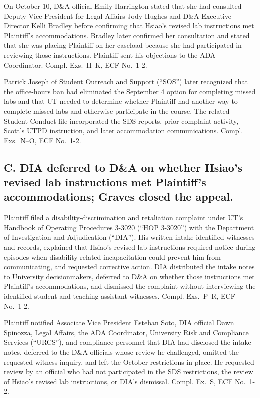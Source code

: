 \documentclass[12pt]{article}
\newcommand{\ComplEx}[1]{Compl. Ex.~#1, ECF No.~1-2}
\newcommand{\ComplExs}[1]{Compl. Exs.~#1, ECF No.~1-2}
\begin{document}
On October 10, D\&A official Emily Harrington stated that she had consulted Deputy Vice President for Legal Affairs Jody Hughes and D\&A Executive Director Kelli Bradley before confirming that Hsiao's revised lab instructions met Plaintiff's accommodations. Bradley later confirmed her consultation and stated that she was placing Plaintiff on her caseload because she had participated in reviewing those instructions. Plaintiff sent his objections to the ADA Coordinator. \ComplExs{H--K}.
 
Patrick Joseph of Student Outreach and Support (``SOS'') later recognized that the office-hours ban had eliminated the September 4 option for completing missed labs and that UT needed to determine whether Plaintiff had another way to complete missed labs and otherwise participate in the course. The related Student Conduct file incorporated the SDS reports, prior complaint activity, Scott's UTPD instruction, and later accommodation communications. \ComplExs{N--O}.
 
\subsection*{C. DIA deferred to D\&A on whether Hsiao's revised lab instructions met Plaintiff's accommodations; Graves closed the appeal.}
 
Plaintiff filed a disability-discrimination and retaliation complaint under UT's Handbook of Operating Procedures 3-3020 (``HOP 3-3020'') with the Department of Investigation and Adjudication (``DIA''). His written intake identified witnesses and records, explained that Hsiao's revised lab instructions required notice during episodes when disability-related incapacitation could prevent him from communicating, and requested corrective action. DIA distributed the intake notes to University decisionmakers, deferred to D\&A on whether those instructions met Plaintiff's accommodations, and dismissed the complaint without interviewing the identified student and teaching-assistant witnesses. \ComplExs{P--R}.
 
Plaintiff notified Associate Vice President Esteban Soto, DIA official Dawn Spinozza, Legal Affairs, the ADA Coordinator, University Risk and Compliance Services (``URCS''), and compliance personnel that DIA had disclosed the intake notes, deferred to the D\&A officials whose review he challenged, omitted the requested witness inquiry, and left the October restrictions in place. He requested review by an official who had not participated in the SDS restrictions, the review of Hsiao's revised lab instructions, or DIA's dismissal. \ComplEx{S}.
 
\end{document}
